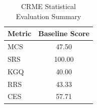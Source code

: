 \begin{table}[htbp]
\centering
\caption{CRME Statistical Evaluation Summary}
\label{tab:crme-statistical-summary}
\begin{tabular}{lc}
\toprule
Metric & Baseline Score \\
\midrule
MCS & 47.50 \\
SRS & 100.00 \\
KGQ & 40.00 \\
RRS & 43.33 \\
CES & 57.71 \\
\bottomrule
\end{tabular}
\end{table}
